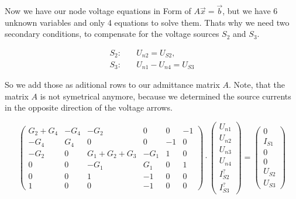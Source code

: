\documentclass[a4paper]{article}
\begin{document}
{Now we have our node voltage equations in Form of $A \vec{x} = \vec{b}$, but we have 6 unknown
variables and only 4 equations to solve them. Thats why we need two secondary conditions, to
compensate for the voltage sources $S_2$ and $S_3$.

\begin{align*}
   S_2: \quad &U_{n2} = U_{S2}, \\ 
   S_3: \quad &U_{n1} - U_{n4} = U_{S3}
\end{align*}

So we add those as aditional rows to our admittance matrix $A$. Note, that the matrix $A$ is not
symetrical anymore, because we determined the source currents in the opposite direction of the
voltage arrows. 

\begin{equation}
\begin{pmatrix}
   G_2 + G_4 & -G_4 & -G_2 & 0 & 0 & -1 \\
   -G_4 & G_4 & 0 & 0 & -1 & 0 \\
   -G_2 & 0 & G_1+G_2+G_3 & -G_1 & 1 & 0 \\
   0 & 0 & -G_1 & G_1 & 0 & 1 \\ 
   0 & 0 & 1 & -1 & 0 & 0 \\
   1 & 0 & 0 & -1 & 0 & 0 
\end{pmatrix}
\cdot
\begin{pmatrix}
   U_{n1} \\ U_{n2} \\ U_{n3} \\ U_{n4} \\ I_{S2}^? \\ I_{S3}^?
\end{pmatrix}
=
\begin{pmatrix}
   0 \\ I_{S1} \\ 0 \\ 0 \\ U_{S2} \\ U_{S3} 
\end{pmatrix}
\label{eqn:nodes_currents_src}
\end{equation}

}
\end{document}
